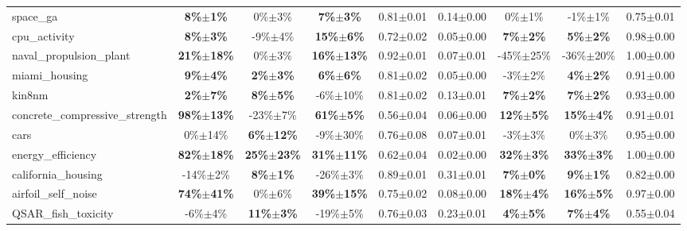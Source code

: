 \begin{table}[t]
\begin{small}
\begin{sc}
{\begin{tabular}{lcccccccc}
space\_ga  &  \textbf{8\%$\pm$1\%}  &  0\%$\pm$3\%  &  \textbf{7\%$\pm$3\%}  &  0.81$\pm$0.01  &  0.14$\pm$0.00  &  0\%$\pm$1\%  &  -1\%$\pm$1\%  &  0.75$\pm$0.01 \\
cpu\_activity  &  \textbf{8\%$\pm$3\%}  &  -9\%$\pm$4\%  &  \textbf{15\%$\pm$6\%}  &  0.72$\pm$0.02  &  0.05$\pm$0.00  &  \textbf{7\%$\pm$2\%}  &  \textbf{5\%$\pm$2\%}  &  0.98$\pm$0.00 \\
naval\_propulsion\_plant  &  \textbf{21\%$\pm$18\%}  &  0\%$\pm$3\%  &  \textbf{16\%$\pm$13\%}  &  0.92$\pm$0.01  &  0.07$\pm$0.01  &  -45\%$\pm$25\%  &  -36\%$\pm$20\%  &  1.00$\pm$0.00 \\
miami\_housing  &  \textbf{9\%$\pm$4\%}  &  \textbf{2\%$\pm$3\%}  &  \textbf{6\%$\pm$6\%}  &  0.81$\pm$0.02  &  0.05$\pm$0.00  &  -3\%$\pm$2\%  &  \textbf{4\%$\pm$2\%}  &  0.91$\pm$0.00 \\
kin8nm  &  \textbf{2\%$\pm$7\%}  &  \textbf{8\%$\pm$5\%}  &  -6\%$\pm$10\%  &  0.81$\pm$0.02  &  0.13$\pm$0.01  &  \textbf{7\%$\pm$2\%}  &  \textbf{7\%$\pm$2\%}  &  0.93$\pm$0.00 \\
concrete\_compressive\_strength  &  \textbf{98\%$\pm$13\%}  &  -23\%$\pm$7\%  &  \textbf{61\%$\pm$5\%}  &  0.56$\pm$0.04  &  0.06$\pm$0.00  &  \textbf{12\%$\pm$5\%}  &  \textbf{15\%$\pm$4\%}  &  0.91$\pm$0.01 \\
cars  &  0\%$\pm$14\%  &  \textbf{6\%$\pm$12\%}  &  -9\%$\pm$30\%  &  0.76$\pm$0.08  &  0.07$\pm$0.01  &  -3\%$\pm$3\%  &  0\%$\pm$3\%  &  0.95$\pm$0.00 \\
energy\_efficiency  &  \textbf{82\%$\pm$18\%}  &  \textbf{25\%$\pm$23\%}  &  \textbf{31\%$\pm$11\%}  &  0.62$\pm$0.04  &  0.02$\pm$0.00  &  \textbf{32\%$\pm$3\%}  &  \textbf{33\%$\pm$3\%}  &  1.00$\pm$0.00 \\
california\_housing  &  -14\%$\pm$2\%  &  \textbf{8\%$\pm$1\%}  &  -26\%$\pm$3\%  &  0.89$\pm$0.01  &  0.31$\pm$0.01  &  \textbf{7\%$\pm$0\%}  &  \textbf{9\%$\pm$1\%}  &  0.82$\pm$0.00 \\
airfoil\_self\_noise  &  \textbf{74\%$\pm$41\%}  &  0\%$\pm$6\%  &  \textbf{39\%$\pm$15\%}  &  0.75$\pm$0.02  &  0.08$\pm$0.00  &  \textbf{18\%$\pm$4\%}  &  \textbf{16\%$\pm$5\%}  &  0.97$\pm$0.00 \\
QSAR\_fish\_toxicity  &  -6\%$\pm$4\%  &  \textbf{11\%$\pm$3\%}  &  -19\%$\pm$5\%  &  0.76$\pm$0.03  &  0.23$\pm$0.01  &  \textbf{4\%$\pm$5\%}  &  \textbf{7\%$\pm$4\%}  &  0.55$\pm$0.04 \\

\bottomrule
\end{tabular}
}
\end{sc}
\end{small}
\end{table}
